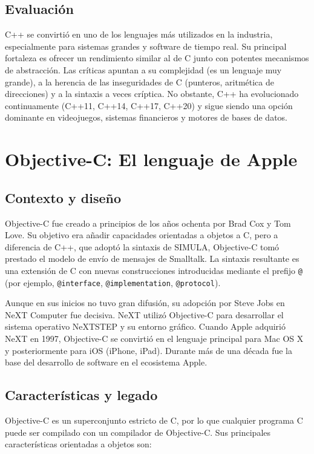 \subsection{Evaluación}

C++ se convirtió en uno de los lenguajes más utilizados en la industria, especialmente para sistemas grandes y software de tiempo real. Su principal fortaleza es ofrecer un rendimiento similar al de C junto con potentes mecanismos de abstracción. Las críticas apuntan a su complejidad (es un lenguaje muy grande), a la herencia de las inseguridades de C (punteros, aritmética de direcciones) y a la sintaxis a veces críptica. No obstante, C++ ha evolucionado continuamente (C++11, C++14, C++17, C++20) y sigue siendo una opción dominante en videojuegos, sistemas financieros y motores de bases de datos.

\section{Objective-C: El lenguaje de Apple}

\subsection{Contexto y diseño}

Objective-C fue creado a principios de los años ochenta por Brad Cox y Tom Love. Su objetivo era añadir capacidades orientadas a objetos a C, pero a diferencia de C++, que adoptó la sintaxis de SIMULA, Objective-C tomó prestado el modelo de envío de mensajes de Smalltalk. La sintaxis resultante es una extensión de C con nuevas construcciones introducidas mediante el prefijo \texttt{@} (por ejemplo, \texttt{@interface}, \texttt{@implementation}, \texttt{@protocol}).

Aunque en sus inicios no tuvo gran difusión, su adopción por Steve Jobs en NeXT Computer fue decisiva. NeXT utilizó Objective-C para desarrollar el sistema operativo NeXTSTEP y su entorno gráfico. Cuando Apple adquirió NeXT en 1997, Objective-C se convirtió en el lenguaje principal para Mac OS X y posteriormente para iOS (iPhone, iPad). Durante más de una década fue la base del desarrollo de software en el ecosistema Apple.

\subsection{Características y legado}

Objective-C es un superconjunto estricto de C, por lo que cualquier programa C puede ser compilado con un compilador de Objective-C. Sus principales características orientadas a objetos son:

